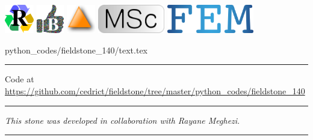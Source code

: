 \includegraphics[height=1.25cm]{images/pictograms/replication}
\includegraphics[height=1.25cm]{images/pictograms/benchmark}
\includegraphics[height=1.25cm]{images/pictograms/triangle}
\includegraphics[height=1.25cm]{images/pictograms/msc}
\includegraphics[height=1.25cm]{images/pictograms/FEM}


\begin{flushright} {\tiny {\color{gray} python\_codes/fieldstone\_140/text.tex}} \end{flushright}



\par\noindent\rule{\textwidth}{0.4pt}

\begin{center}
Code at \url{https://github.com/cedrict/fieldstone/tree/master/python_codes/fieldstone_140}
\end{center}

\par\noindent\rule{\textwidth}{0.4pt}

{\sl This stone was developed in collaboration with Rayane Meghezi}. 

\par\noindent\rule{\textwidth}{0.4pt}

